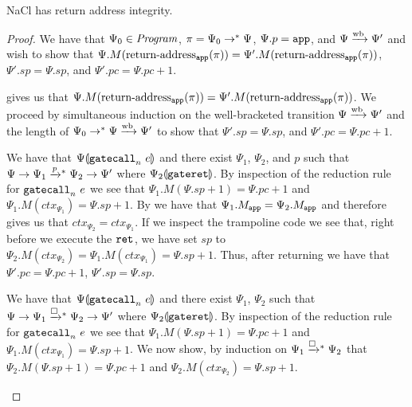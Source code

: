 \begin{proposition}
  NaCl has return address integrity.
\end{proposition}
\begin{proof}
  We have that $\Psi_0 \in \mathit{Program}$, $\pi = \Psi_0 \mathrel{\mathrel{\rightarrow}^{\ast}} \Psi$, $\Psi.p = \mathtt{app}$, and $\Psi \mathrel{\xrightarrow{\!\text{wb}}} \Psi'$ and wish to show that $\Psi.M(\operatorname{return-address}_{\mathtt{app}}(\pi)) = \Psi'.M(\operatorname{return-address}_{\mathtt{app}}(\pi))$, $\Psi'.sp = \Psi.sp$, and $\Psi'.pc = \Psi.pc + 1$.

   gives us that $\Psi.M(\operatorname{return-address}_{\mathtt{app}}(\pi)) = \Psi'.M(\operatorname{return-address}_{\mathtt{app}}(\pi))$.
  We proceed by simultaneous induction on the well-bracketed transition $\Psi \mathrel{\xrightarrow{\!\text{wb}}} \Psi'$ and the length of $\Psi_0 \mathrel{\mathrel{\rightarrow}^{\ast}} \Psi \mathrel{\xrightarrow{\!\text{wb}}} \Psi'$ to show that $\Psi'.sp = \Psi.sp$, and $\Psi'.pc = \Psi.pc + 1$.

  \begin{itemize}

    We have that ${\Psi}\llparenthesis{\ensuremath{\mathtt{gatecall}_{n}\ {e}}}\rrparenthesis$ and there exist $\Psi_1$, $\Psi_2$, and $p$ such that $\Psi \step \Psi_1 \steppstar{p} \Psi_2 \step \Psi'$ where ${\Psi_2}\llparenthesis{\ensuremath{\mathtt{gateret}}}\rrparenthesis$.
    By inspection of the reduction rule for $\mathtt{gatecall}_{n}\ {e}$ we see that $\Psi_1.M(\Psi.sp + 1) = \Psi.pc + 1$ and $\Psi_1.M(ctx_{\Psi_1}) = \Psi.sp + 1$.
    By  we have that $\Psi_1.M_{\mathtt{app}} = \Psi_2.M_{\mathtt{app}}$ and therefore  gives us that $ctx_{\Psi_2} = ctx_{\Psi_1}$.
    If we inspect the trampoline code we see that, right before we execute the $\mathtt{ret}_{{}}$, we have set $sp$ to $\Psi_2.M(ctx_{\Psi_2}) = \Psi_1.M(ctx_{\Psi_1}) = \Psi.sp + 1$.
    Thus, after returning we have that $\Psi'.pc = \Psi.pc + 1$, $\Psi'.sp = \Psi.sp$.


    We have that ${\Psi}\llparenthesis{\ensuremath{\mathtt{gatecall}_{n}\ {e}}}\rrparenthesis$ and there exist $\Psi_1$, $\Psi_2$  such that $\Psi \step \Psi_1 \stepboxstar \Psi_2 \step \Psi'$ where ${\Psi_2}\llparenthesis{\ensuremath{\mathtt{gateret}}}\rrparenthesis$.
    By inspection of the reduction rule for $\mathtt{gatecall}_{n}\ {e}$ we see that $\Psi_1.M(\Psi.sp + 1) = \Psi.pc + 1$ and $\Psi_1.M(ctx_{\Psi_1}) = \Psi.sp + 1$.
    We now show, by induction on $\Psi_1 \stepboxstar \Psi_2$ that $\Psi_2.M(\Psi.sp + 1) = \Psi.pc + 1$ and $\Psi_2.M(ctx_{\Psi_2}) = \Psi.sp + 1$.


\end{itemize}
\end{proof}
